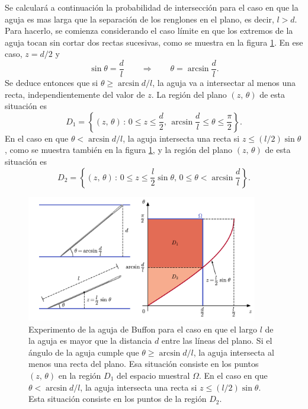 \documentclass[a4paper]{report}
\begin{document}
Se calculará a continuación la probabilidad de intersección para el caso en que la aguja es mas larga que la separación de los renglones en el plano, es decir, \(l>d\). Para hacerlo, se comienza considerando el caso límite en que los extremos de la aguja tocan sin cortar dos rectas sucesivas, como se muestra en la figura \ref{fig:buffon_needle_long}. En ese caso, \(z=d/2\) y
\[
 \sin\theta=\frac{d}{l}\qquad\Rightarrow\qquad\theta=\arcsin\frac{d}{l}.
\]
Se deduce entonces que si \(\theta\geq\arcsin d/l\), la aguja va a intersectar al menos una recta, independientemente del valor de \(z\). La región del plano \((z,\,\theta)\) de esta situación es
\[
 D_1=\left\{(z,\,\theta)\,:\,0\leq z\leq\frac{d}{2},\,\arcsin\frac{d}{l}\leq\theta\leq\frac{\pi}{2}\right\}.
\]
En el caso en que \(\theta<\arcsin d/l\), la aguja intersecta una recta si \(z\leq(l/2)\sin\theta\), como se muestra también en la figura \ref{fig:buffon_needle_long}, y la región del plano \((z,\,\theta)\) de esta situación es
\[
 D_2=\left\{(z,\,\theta)\,:\,0\leq z\leq\frac{l}{2}\sin\theta,\,0\leq\theta<\arcsin\frac{d}{l}\right\}.
\]
\begin{figure}[!htb]
\begin{center}
\includegraphics[width=0.9\textwidth]{figuras/buffon_needle_long.pdf}
\caption{\label{fig:buffon_needle_long} Experimento de la aguja de Buffon para el caso en que el largo \(l\) de la aguja es mayor que la distancia \(d\) entre las líneas del plano. Si el ángulo de la aguja cumple que \(\theta\geq\arcsin d/l\), la aguja intersecta al menos una recta del plano. Esa situación consiste en los puntos \((z,\,\theta)\) en la región \(D_1\) del espacio muestral \(\Omega\). En el caso en que \(\theta<\arcsin d/l\), la aguja intersecta una recta si \(z\leq(l/2)\sin\theta\). Esta situación consiste en los puntos de la región \(D_2\).}
\end{center}
\end{figure}
\end{document}
